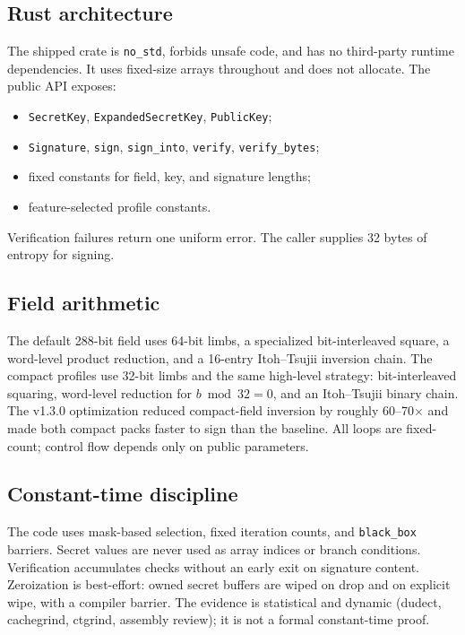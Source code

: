 \documentclass[11pt,a4paper]{article}
\begin{document}
\subsection{Rust architecture}

The shipped crate is \texttt{no\_std}, forbids unsafe code, and has no
third-party runtime dependencies. It uses fixed-size arrays throughout and
does not allocate. The public API exposes:
\begin{itemize}
  \item \texttt{SecretKey}, \texttt{ExpandedSecretKey}, \texttt{PublicKey};
  \item \texttt{Signature}, \texttt{sign}, \texttt{sign\_into},
        \texttt{verify}, \texttt{verify\_bytes};
  \item fixed constants for field, key, and signature lengths;
  \item feature-selected profile constants.
\end{itemize}
Verification failures return one uniform error. The caller supplies 32 bytes
of entropy for signing.

\subsection{Field arithmetic}

The default 288-bit field uses 64-bit limbs, a specialized bit-interleaved
square, a word-level product reduction, and a 16-entry Itoh--Tsujii inversion
chain. The compact profiles use 32-bit limbs and the same high-level strategy:
bit-interleaved squaring, word-level reduction for $b\bmod32=0$, and an
Itoh--Tsujii binary chain. The v1.3.0 optimization reduced compact-field
inversion by roughly 60--70$\times$ and made both compact packs faster to sign
than the baseline. All loops are fixed-count; control flow depends only on
public parameters.

\subsection{Constant-time discipline}

The code uses mask-based selection, fixed iteration counts, and
\texttt{black\_box} barriers. Secret values are never used as array indices or
branch conditions. Verification accumulates checks without an early exit on
signature content. Zeroization is best-effort: owned secret buffers are
wiped on drop and on explicit wipe, with a compiler barrier. The evidence is
statistical and dynamic (dudect, cachegrind, ctgrind, assembly review); it is
not a formal constant-time proof.
\end{document}
